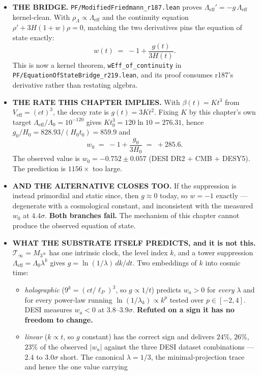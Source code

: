 \begin{itemize}
\item \textbf{THE BRIDGE.} \texttt{PF/ModifiedFriedmann\_r187.lean} proves
$\Lambda_{\text{eff}}' = -g\,\Lambda_{\text{eff}}$ kernel-clean. With
$\rho_\Lambda \propto \Lambda_{\text{eff}}$ and the continuity equation
$\rho' + 3H(1+w)\rho = 0$, matching the two derivatives pins the equation of
state exactly:
\[
  w(t) \;=\; -1 + \frac{g(t)}{3H(t)} .
\]
This is now a kernel theorem, \texttt{wEff\_of\_continuity} in
\texttt{PF/EquationOfStateBridge\_r219.lean}, and its proof consumes r187's
derivative rather than restating algebra.
\item \textbf{THE RATE THIS CHAPTER IMPLIES.} With $\beta(t) = Kt^3$ from
$V_{\text{eff}} = (ct)^3$, the decay rate is $g(t) = 3Kt^2$. Fixing $K$ by this
chapter's own target $\Lambda_{\text{eff}}/\Lambda_0 = 10^{-120}$ gives
$Kt_0^3 = 120\ln 10 = 276.31$, hence $g_0/H_0 = 828.93/(H_0t_0) = 859.9$ and
\[
  w_0 \;=\; -1 + \frac{g_0}{3H_0} \;=\; +285.6 .
\]
The observed value is $w_0 = -0.752 \pm 0.057$ (DESI DR2 + CMB + DESY5). The
prediction is $1156\times$ too large.
\item \textbf{AND THE ALTERNATIVE CLOSES TOO.} If the suppression is instead
primordial and static since, then $g \approx 0$ today, so $w = -1$ exactly ---
degenerate with a cosmological constant, and inconsistent with the measured
$w_0$ at $4.4\sigma$. \textbf{Both branches fail.} The mechanism of this chapter
cannot produce the observed equation of state.
\item \textbf{WHAT THE SUBSTRATE ITSELF PREDICTS, and it is not this.}
$\mathcal{T}_\infty = M_{3^\infty}$ has one intrinsic clock, the level index
$k$, and a tower suppression $\Lambda_{\text{eff}} = \Lambda_0\lambda^k$ gives
$g = \ln(1/\lambda)\,dk/dt$. Two embeddings of $k$ into cosmic time:
\begin{itemize}
\item \emph{holographic} ($9^k = (ct/\ell_P)^3$, so $g \propto 1/t$) predicts
$w_a > 0$ for \emph{every} $\lambda$ and for every power-law running
$\ln(1/\lambda_k) \propto k^p$ tested over $p \in [-2,4]$. DESI measures
$w_a < 0$ at $3.8$--$3.9\sigma$. \textbf{Refuted on a sign it has no freedom to
change.}
\item \emph{linear} ($k \propto t$, so $g$ constant) has the correct sign and
delivers $24\%$, $26\%$, $23\%$ of the observed $|w_a|$ against the three DESI
dataset combinations --- $2.4$ to $3.0\sigma$ short. The canonical
$\lambda = 1/3$, the minimal-projection trace and hence the one value carrying

\end{itemize}
\end{itemize}
